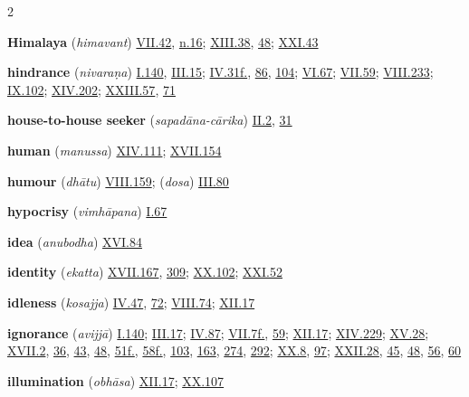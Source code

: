\begin{multicols}{2}
\begin{vismHanging}
\par\textbf{Himalaya} (\emph{himavant}) \hyperlink{VII.42}{VII.42}{}, \hyperlink{VII.n16}{n.16}{}; \hyperlink{XIII.38}{XIII.38}{}, \hyperlink{XIII.48}{48}{}; \hyperlink{XXI.43}{XXI.43}{}
\par\textbf{hindrance} (\emph{nivaraṇa}) \hyperlink{I.140}{I.140}{}, \hyperlink{III.15}{III.15}{}; \hyperlink{IV.31}{IV.31f.}{}, \hyperlink{IV.86}{86}{}, \hyperlink{IV.104}{104}{}; \hyperlink{VI.67}{VI.67}{}; \hyperlink{VII.59}{VII.59}{}; \hyperlink{VIII.233}{VIII.233}{}; \hyperlink{IX.102}{IX.102}{}; \hyperlink{XIV.202}{XIV.202}{}; \hyperlink{XXIII.57}{XXIII.57}{}, \hyperlink{XXIII.71}{71}{}
\par\textbf{house-to-house seeker} (\emph{sapadāna-cārika}) \hyperlink{II.2}{II.2}{}, \hyperlink{II.31}{31}{}
\par\textbf{human} (\emph{manussa}) \hyperlink{XIV.111}{XIV.111}{}; \hyperlink{XVII.154}{XVII.154}{}
\par\textbf{humour} (\emph{dhātu}) \hyperlink{VIII.159}{VIII.159}{}; (\emph{dosa}) \hyperlink{III.80}{III.80}{}
\par\textbf{hypocrisy} (\emph{vimhāpana}) \hyperlink{I.67}{I.67}{}
\par\textbf{idea} (\emph{anubodha}) \hyperlink{XVI.84}{XVI.84}{}
\par\textbf{identity} (\emph{ekatta}) \hyperlink{XVII.167}{XVII.167}{}, \hyperlink{XVII.309}{309}{}; \hyperlink{XX.102}{XX.102}{}; \hyperlink{XXI.52}{XXI.52}{}
\par\textbf{idleness} (\emph{kosajja}) \hyperlink{IV.47}{IV.47}{}, \hyperlink{IV.72}{72}{}; \hyperlink{VIII.74}{VIII.74}{}; \hyperlink{XII.17}{XII.17}{}
\par\textbf{ignorance} (\emph{avijjā}) \hyperlink{I.140}{I.140}{}; \hyperlink{III.17}{III.17}{}; \hyperlink{IV.87}{IV.87}{}; \hyperlink{VII.7}{VII.7f.}{}, \hyperlink{VII.59}{59}{}; \hyperlink{XII.17}{XII.17}{}; \hyperlink{XIV.229}{XIV.229}{}; \hyperlink{XV.28}{XV.28}{}; \hyperlink{XVII.2}{XVII.2}{}, \hyperlink{XVII.36}{36}{}, \hyperlink{XVII.43}{43}{}, \hyperlink{XVII.48}{48}{}, \hyperlink{XVII.51}{51f.}{}, \hyperlink{XVII.58}{58f.}{}, \hyperlink{XVII.103}{103}{}, \hyperlink{XVII.163}{163}{}, \hyperlink{XVII.274}{274}{}, \hyperlink{XVII.292}{292}{}; \hyperlink{XX.8}{XX.8}{}, \hyperlink{XX.97}{97}{}; \hyperlink{XXII.28}{XXII.28}{}, \hyperlink{XXII.45}{45}{}, \hyperlink{XXII.48}{48}{}, \hyperlink{XXII.56}{56}{}, \hyperlink{XXII.60}{60}{}
\par\textbf{illumination} (\emph{obhāsa}) \hyperlink{XII.17}{XII.17}{}; \hyperlink{XX.107}{XX.107}{}

\end{vismHanging}
\end{multicols}
